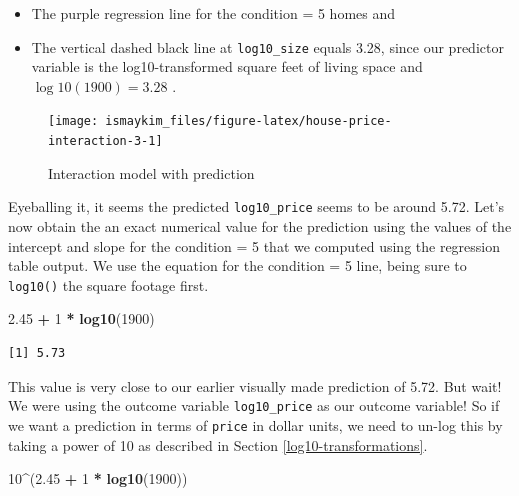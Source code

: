\documentclass[12pt, krantz2,]{krantz}
\makeatletter
\newenvironment{Shaded}{\begin{snugshade}}{\end{snugshade}}
\newcommand{\DecValTok}[1]{\textcolor[rgb]{0.06,0.06,0.06}{#1}}
\newcommand{\FloatTok}[1]{\textcolor[rgb]{0.06,0.06,0.06}{#1}}
\newcommand{\KeywordTok}[1]{\textcolor[rgb]{0.27,0.27,0.27}{\textbf{#1}}}
\newcommand{\NormalTok}[1]{#1}
\newcommand{\OperatorTok}[1]{\textcolor[rgb]{0.43,0.43,0.43}{\textbf{#1}}}
\newcommand{\StringTok}[1]{\textcolor[rgb]{0.5,0.5,0.5}{#1}}
\providecommand{\tightlist}{%
  \setlength{\itemsep}{0pt}\setlength{\parskip}{0pt}}
\newenvironment{kframe}{%
\medskip{}
\setlength{\fboxsep}{.8em}
 \def\at@end@of@kframe{}%
 \ifinner\ifhmode%
  \def\at@end@of@kframe{\end{minipage}}%
  \begin{minipage}{\columnwidth}%
 \fi\fi%
 \def\FrameCommand##1{\hskip\@totalleftmargin \hskip-\fboxsep
 \colorbox{shadecolor}{##1}\hskip-\fboxsep
     \hskip-\linewidth \hskip-\@totalleftmargin \hskip\columnwidth}%
 \MakeFramed {\advance\hsize-\width
   \@totalleftmargin\z@ \linewidth\hsize
   \@setminipage}}%
 {\par\unskip\endMakeFramed%
 \at@end@of@kframe}
\renewenvironment{Shaded}{\begin{kframe}}{\end{kframe}}
\makeatother
\begin{document}
\begin{itemize}
\tightlist
\item
  The purple regression line for the condition = 5 homes and
\item
  The vertical dashed black line at \texttt{log10\_size} equals 3.28, since our predictor variable is the log10-transformed square feet of living space and \(\log10(1900) = 3.28\) .
\end{itemize}

\begin{figure}

{\centering \texttt{[image: ismaykim\_files/figure-latex/house-price-interaction-3-1]} 

}

\caption{Interaction model with prediction}\label{fig:house-price-interaction-3}
\end{figure}

Eyeballing it, it seems the predicted \texttt{log10\_price} seems to be around 5.72. Let's now obtain the an exact numerical value for the prediction using the values of the intercept and slope for the condition = 5 that we computed using the regression table output. We use the equation for the condition = 5 line, being sure to \texttt{log10()} the
square footage first.

\begin{Shaded}
\begin{Highlighting}[]
\FloatTok{2.45} \OperatorTok{+}\StringTok{ }\DecValTok{1} \OperatorTok{*}\StringTok{ }\KeywordTok{log10}\NormalTok{(}\DecValTok{1900}\NormalTok{)}
\end{Highlighting}
\end{Shaded}

\begin{verbatim}
[1] 5.73
\end{verbatim}

This value is very close to our earlier visually made prediction of 5.72. But wait! We were using the outcome variable \texttt{log10\_price} as our outcome variable! So if we want a prediction in terms of \texttt{price} in dollar units, we need to un-log this by taking a power of 10 as described in Section \ref{log10-transformations}.

\begin{Shaded}
\begin{Highlighting}[]
\DecValTok{10}\OperatorTok{^}\NormalTok{(}\FloatTok{2.45} \OperatorTok{+}\StringTok{ }\DecValTok{1} \OperatorTok{*}\StringTok{ }\KeywordTok{log10}\NormalTok{(}\DecValTok{1900}\NormalTok{))}
\end{Highlighting}
\end{Shaded}
\end{document}
